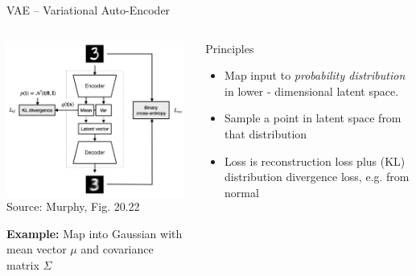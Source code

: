 \documentclass[ignorenonframetext,xcolor=x11names]{beamer}
\begin{document}
\begin{frame}{VAE -- Variational Auto-Encoder}

\begin{columns}
\begin{column}{.5\textwidth}
\begin{center}
\includegraphics[height=2in]{murphy_20_22.png}\\

\scriptsize Source: Murphy, Fig. 20.22 \normalsize \\
\end{center}

\textbf{Example:} Map into Gaussian with mean vector $\mu$ and covariance matrix $\Sigma$
\end{column}
\begin{column}{.5\textwidth}
\begin{block}{Principles}
\begin{itemize}
\item Map input to \emph{probability distribution} in lower - dimensional latent space.
\item Sample a point in latent space from that distribution
\item Loss is reconstruction loss plus (KL) distribution divergence loss, e.g. from normal
\end{itemize}
\end{block}
\end{column}
\end{columns}
\end{frame}
\end{document}
